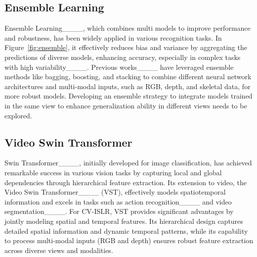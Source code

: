 \subsection{Ensemble Learning} 
Ensemble Learning____, which combines multi models to improve performance and robustness, has been widely applied in various recognition tasks.
In Figure~\ref{fig:ensemble}, it effectively reduces bias and variance by aggregating the predictions of diverse models, enhancing accuracy, especially in complex tasks with high variability____.
Previous works____ have leveraged ensemble methods like bagging, boosting, and stacking to combine different neural network architectures and multi-modal inputs, such as RGB, depth, and skeletal data, for more robust models.
Developing an ensemble strategy to integrate models trained in the same view to enhance generalization ability in different views needs to be explored.


\subsection{Video Swin Transformer} 
Swin Transformer____, initially developed for image classification, has achieved remarkable success in various vision tasks by capturing local and global dependencies through hierarchical feature extraction. Its extension to video, the Video Swin Transformer____ (VST), effectively models spatiotemporal information and excels in tasks such as action recognition____ and video segmentation____. For CV-ISLR, VST provides significant advantages by jointly modeling spatial and temporal features. Its hierarchical design captures detailed spatial information and dynamic temporal patterns, while its capability to process multi-modal inputs (RGB and depth) ensures robust feature extraction across diverse views and modalities.